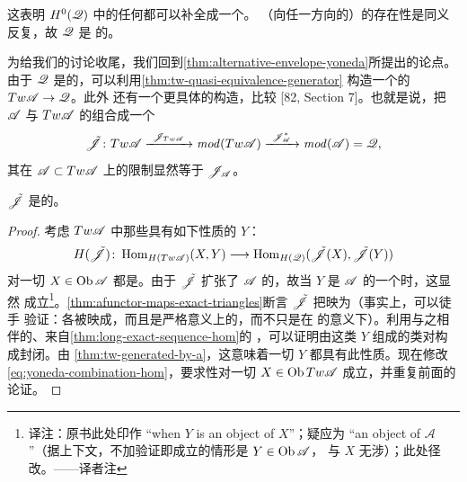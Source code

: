 这表明 $H^0(\mathscr{Q})$ 中的任何\trMorphism{}都可以补全成一个\trExactTriangle。
（向任一方向的）\trSuspension\trModule{}的存在性是同义反复，故 $\mathscr{Q}$ 是%
\trTriangulated{}的。

为给我们的讨论收尾，我们回到\cref{thm:alternative-envelope-yoneda}所提出的论点。
由于 $\mathscr{Q}$ 是\trTriangulated{}的，可以利用\cref{thm:tw-quasi-equivalence-generator}
构造一个\trCohomology\trFullyFaithful{}的\trFunctor{} $Tw\mathscr{A}\to\mathscr{Q}$。此外
还有一个更具体的构造，比较 [82, Section 7]。也就是说，把 $\mathscr{A}$ 与 $Tw\mathscr{A}$
的\trYonedaEmbedding{}组合成一个 \trAFunctor
\begin{equation*}
\tilde{\scr{J}}\colon Tw\scr{A}
\xrightarrow{\ \scr{J}_{Tw\scr{A}}\ }\mathit{mod}(Tw\scr{A})
\xrightarrow{\ \scr{J}^*_{\scr{A}}\ }\mathit{mod}(\scr{A})=\scr{Q},
\end{equation*}
其在 $\mathscr{A}\subset Tw\mathscr{A}$ 上的限制显然等于 $\mathscr{J}_{\mathscr{A}}$。

\begin{lemma}\label{thm:tw-yoneda-combination-cff}
$\tilde{\mathscr{J}}$ 是\trCohomology\trFullyFaithful{}的。
\end{lemma}

\begin{proof}
考虑 $Tw\mathscr{A}$ 中那些具有如下性质的\trObject{} $Y$：
\begin{equation}\label{eq:yoneda-combination-hom}
H(\tilde{\mathscr{J}})\colon\operatorname{Hom}_{H(Tw\mathscr{A})}(X,Y)
\longrightarrow\operatorname{Hom}_{H(\mathscr{Q})}(\tilde{\mathscr{J}}(X),\tilde{\mathscr{J}}(Y))
\end{equation}
对一切 $X\in\operatorname{Ob}\mathscr{A}$ 都是\trIsomorphism。由于 $\tilde{\mathscr{J}}$ 扩张了
$\mathscr{A}$ 的\trYonedaEmbedding，故当 $Y$ 是 $\mathscr{A}$ 的一个\trObject{}时，这显然
成立\footnote{译注：原书此处印作 “when $Y$ is an object of $X$”；疑应为 “an
object of $\mathscr{A}$”（据上下文，不加验证即成立的情形是 $Y\in\operatorname{Ob}\mathscr{A}$，
与 $X$ 无涉）；此处径改。——译者注}。\cref{thm:afunctor-maps-exact-triangles}断言
$\tilde{\mathscr{J}}$ 把\trExactTriangle{}映为\trExactTriangle（事实上，可以徒手
验证：各\trCone{}被映成\trCone，而且是严格意义上的，而不只是在\trIsomorphism{}%
的意义下）。利用与之相伴的、来自\cref{thm:long-exact-sequence-hom}的%
\trLongExactSequence，可以证明由这类 $Y$ 组成的类对构成\trMappingCone{}封闭。由
\cref{thm:tw-generated-by-a}，这意味着一切 $Y$ 都具有此性质。现在修改
\eqref{eq:yoneda-combination-hom}，要求\trBijective{}性对一切
$X\in\operatorname{Ob} Tw\mathscr{A}$ 成立，并重复前面的论证。
\end{proof}
